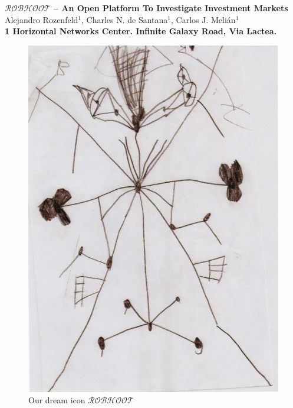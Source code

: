 \documentclass[english,12pt]{article}
\date{}
\begin{document}
\begin{flushleft}
\textbf{\Large {$\mathcal{ROBHOOT}$} -- An Open Platform To Investigate Investment Markets}
\\
\vspace{1.0cm} Alejandro Rozenfeld$^{1}$, Charles N. de Santana$^{1}$, Carlos J. Meli\'an$^{1}$
\\
\vspace{1.0cm} \bf{1} Horizontal Networks Center. Infinite Galaxy Road, Via Lactea.
\\
\begin{figure}
\vspace{-3 in}
\begin{center}
\includegraphics[scale=0.4]{robhoot.pdf}
\end{center}
\caption{Our dream icon $\mathcal{ROBHOOT}$}
\end{figure}
\end{flushleft}
\end{document}
